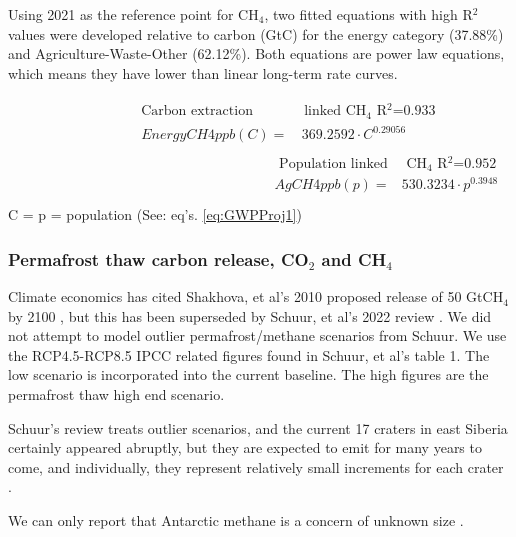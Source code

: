 \documentclass{article}
\begin{document}
Using 2021 as the reference point for CH$_4$, two fitted equations with high R$^2$ values were developed relative to carbon (GtC) for the energy category (37.88\%) and Agriculture-Waste-Other (62.12\%). Both equations are power law equations, which means they have lower than linear long-term rate curves. 

\begin{align}
    \begin{split} 
\label{eq:CH4fromCandPop}
 \text{Carbon extraction} & \text{ linked CH$_4$   R$^2$=0.933} \qquad \qquad \text{ }\\
EnergyCH4ppb(C) =&\,  369.2592 \cdot C^{0.29056}  \\
\end{split}
 \begin{split}
 \text{ Population linked} & \text{ CH$_4$   R$^2$=0.952 } \\ 
 AgCH4ppb(p) =& 530.3234 \cdot p^{0.3948}  \\
\end{split}
\end{align}
\qquad \qquad \qquad \qquad {} C  =    \qquad p = population (See: eq's. \ref{eq:GWPProj1})

\subsubsection{Permafrost thaw carbon release, CO$_2$ and CH$_4$ }
\label{PermafrostCH4}
Climate economics has cited Shakhova, et al's 2010 proposed release of 50 GtCH$_4$ by 2100 \cite{Shakhova2010MethanEastSiberianShelf}, but this has been superseded by Schuur, et al's 2022 review \cite{Schuur2022PermafrostFeedbacksWarming}. We did not attempt to model outlier permafrost/methane scenarios from Schuur. We use the RCP4.5-RCP8.5 IPCC related figures found in Schuur, et al's table 1. The low scenario is incorporated into the current baseline. The high figures are the permafrost thaw high end scenario. 

Schuur's review treats outlier scenarios, and the current 17 craters in east Siberia certainly appeared abruptly, but they are expected to emit for many years to come, and individually, they represent relatively small increments for each crater \cite{Zolkos2021CH3Craters,Bogoyavlensky2021PermanentCH3emission}.

We can only report that Antarctic methane is a concern of unknown size \cite{Seabrook2025AntarcticSeepEmergenceAndDiscoveryInTheShallowCoastalEnvironment}. 
\end{document}
